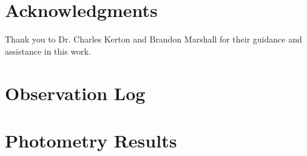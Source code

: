 \documentclass[%
aip,
jmp,
reprint,
floatfix
]{revtex4-1}
\begin{document}

	\section*{Acknowledgments}

	Thank you to Dr. Charles Kerton and Brandon Marshall for their guidance and assistance in this work.




	\onecolumngrid
	\appendix
	\section{Observation Log}

	\begin{table}[H]
		\centering
		
		\label{table:log}
	\end{table}

	\section{Photometry Results} \label{sec:res}
	
	\begin{table}[H]
		\centering
		
		\label{table:fullresv}
	\end{table}

	\begin{table}[H]
		\centering
		
		\label{table:fullresb}
	\end{table}
\end{document}

